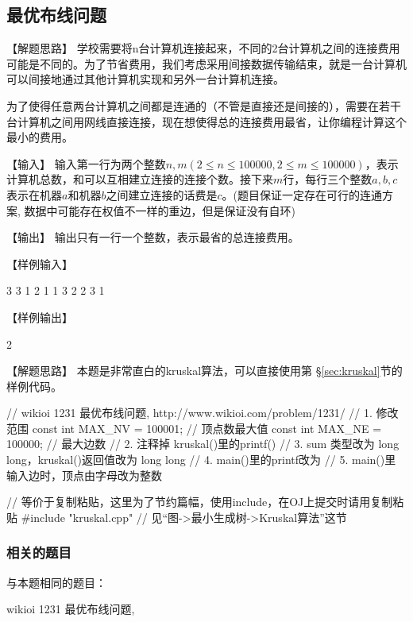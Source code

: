 \subsection{最优布线问题 }
【解题思路】
学校需要将n台计算机连接起来，不同的2台计算机之间的连接费用可能是不同的。为了节省费用，我们考虑采用间接数据传输结束，就是一台计算机可以间接地通过其他计算机实现和另外一台计算机连接。

为了使得任意两台计算机之间都是连通的（不管是直接还是间接的），需要在若干台计算机之间用网线直接连接，现在想使得总的连接费用最省，让你编程计算这个最小的费用。

【输入】
输入第一行为两个整数$n,m(2 \leq n \leq 100000,2\leq m \leq 100000)$，表示计算机总数，和可以互相建立连接的连接个数。接下来$m$行，每行三个整数$a,b,c$ 表示在机器$a$和机器$b$之间建立连接的话费是$c$。(题目保证一定存在可行的连通方案, 数据中可能存在权值不一样的重边，但是保证没有自环)

【输出】
输出只有一行一个整数，表示最省的总连接费用。

【样例输入】
\begin{Code}
    3 3
    1 2 1
    1 3 2
    2 3 1
\end{Code}

【样例输出】
\begin{Code}
    2
\end{Code}

【解题思路】
本题是非常直白的kruskal算法，可以直接使用第 \S \ref{sec:kruskal}节的样例代码。

\begin{Codex}[label=wiring.c]
    // wikioi 1231 最优布线问题, http://www.wikioi.com/problem/1231/
    // 1. 修改范围
    const int MAX_NV = 100001; // 顶点数最大值
    const int MAX_NE = 100000;  // 最大边数
    // 2. 注释掉 kruskal()里的printf()
    // 3. sum 类型改为 long long，kruskal()返回值改为 long long
    // 4. main()里的printf改为 %
    // 5. main()里输入边时，顶点由字母改为整数

    // 等价于复制粘贴，这里为了节约篇幅，使用include，在OJ上提交时请用复制粘贴
    #include "kruskal.cpp"  // 见“图->最小生成树->Kruskal算法”这节
\end{Codex}

\subsubsection{相关的题目}
与本题相同的题目：
\begindot
\item wikioi 1231 最优布线问题, 
\myenddot

